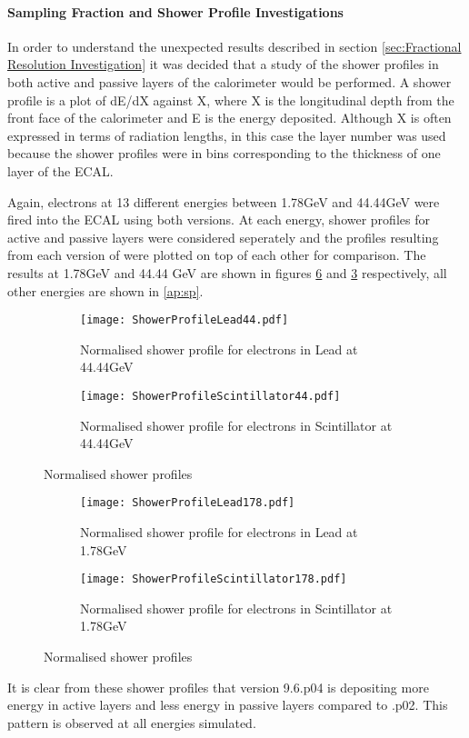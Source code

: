\paragraph{Sampling Fraction and Shower Profile Investigations}
\label{sec:Sampling Fraction and Shower Profile Investigations}
In order to understand the unexpected results described in section \ref{sec:Fractional Resolution Investigation} it was decided that a study of the shower profiles in both active and passive layers of the calorimeter would be performed.  A shower profile is a plot of dE/dX against X, where X is the longitudinal depth from the front face of the calorimeter and E is the energy deposited.  Although X is often expressed in terms of radiation lengths, in this case the layer number was used because the shower profiles were in bins corresponding to the thickness of one layer of the ECAL.

Again, electrons at 13 different energies between 1.78GeV and 44.44GeV were fired into the ECAL using both \geant versions.  At each energy, shower profiles for active and passive layers were considered seperately and the profiles resulting from each version of \geant were plotted on top of each other for comparison.  The results at 1.78GeV and 44.44 GeV are shown in figures \ref{fig:1.78sp} and \ref{fig:44.44sp} respectively, all other energies are shown in \ref{ap:sp}.
\begin{figure}[h]
  \begin{subfigure}{.5\textwidth}
    \centering
    \texttt{[image: ShowerProfileLead44.pdf]}
    \caption{Normalised shower profile for electrons in Lead at 44.44GeV}
    \label{fig:44.44splead}
  \end{subfigure}
  \begin{subfigure}{.5\textwidth}
    \centering
    \texttt{[image: ShowerProfileScintillator44.pdf]}
    \caption{Normalised shower profile for electrons in Scintillator at 44.44GeV}
    \label{fig:44.44spscint}
  \end{subfigure}
  \caption{Normalised shower profiles}
  \label{fig:44.44sp}
\end{figure}
\begin{figure}[h]
  \begin{subfigure}{.5\textwidth}
    \centering
    \texttt{[image: ShowerProfileLead178.pdf]}
    \caption{Normalised shower profile for electrons in Lead at 1.78GeV}
    \label{fig:1.78splead}
  \end{subfigure}
  \begin{subfigure}{.5\textwidth}
    \centering
    \texttt{[image: ShowerProfileScintillator178.pdf]}
    \caption{Normalised shower profile for electrons in Scintillator at 1.78GeV}
    \label{fig:1.78spscint}
  \end{subfigure}
  \caption{Normalised shower profiles}
  \label{fig:1.78sp}
\end{figure}
It is clear from these shower profiles that \geant version 9.6.p04 is depositing more energy in active layers and less energy in passive layers compared to .p02.  This pattern is observed at all energies simulated.

